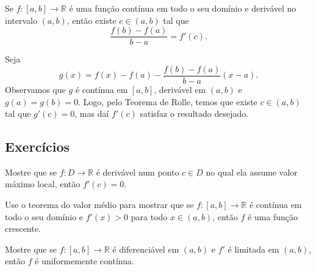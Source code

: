 \begin{teo}
  Se $f:[a, b]\to\mathbb{R}$ é uma função contínua em todo o seu domínio e derivável no intervalo $(a, b)$, então existe $c\in (a, b)$ tal que
  \begin{equation}
    \frac{f(b) - f(a)}{b - a} = f'(c).
  \end{equation}
\end{teo}
\begin{dem}
  Seja
  \begin{equation}
    g(x) = f(x) - f(a) - \frac{f(b) - f(a)}{b - a}(x-a).
  \end{equation}
Observamos que $g$ é contínua em $[a, b]$, derivável em $(a, b)$ e $g(a)=g(b)=0$. Logo, pelo Teorema de Rolle, temos que existe $c\in (a, b)$ tal que $g'(c) = 0$, mas daí $f'(c)$ satisfaz o resultado desejado.
\end{dem}

\subsection*{Exercícios}

\begin{exer}\label{exer:ponto_de_minimo}
  Mostre que se $f:D\to\mathbb{R}$ é derivável num ponto $c\in D$ no qual ela assume valor máximo local, então $f'(c) = 0$.   
\end{exer}

\begin{exer}
  Use o teorema do valor médio para mostrar que se $f:[a, b]\to \mathbb{R}$ é contínua em todo o seu domínio e $f'(x)>0$ para todo $x\in (a, b)$, então $f$ é uma função crescente.
\end{exer}

\begin{exer}
  Mostre que se $f:[a, b]\to\mathbb{R}$ é diferenciável em $(a, b)$ e $f'$ é limitada em $(a, b)$, então $f$ é uniformemente contínua.
\end{exer}

